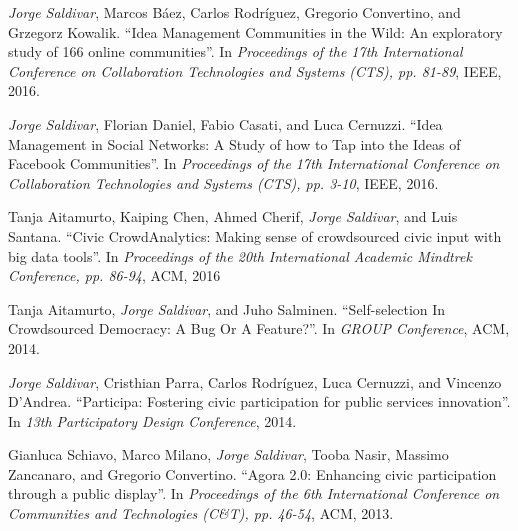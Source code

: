 \textit{Jorge Saldivar}, Marcos Báez, Carlos Rodríguez, Gregorio Convertino, and Grzegorz Kowalik. ``Idea Management Communities in the Wild: An exploratory study of 166 online communities''. In \textit{Proceedings of the 17th International Conference on Collaboration Technologies and Systems (CTS), pp. 81-89}, IEEE, 2016.

\textit{Jorge Saldivar}, Florian Daniel, Fabio Casati, and Luca Cernuzzi. ``Idea Management in Social Networks: A Study of how to Tap into the Ideas of Facebook Communities''. In \textit{Proceedings of the 17th International Conference on Collaboration Technologies and Systems (CTS), pp. 3-10}, IEEE, 2016.

Tanja Aitamurto, Kaiping Chen, Ahmed Cherif, \textit{Jorge Saldivar}, and Luis Santana. ``Civic CrowdAnalytics: Making sense of crowdsourced civic input with big data tools''. In \textit{Proceedings of the 20th International Academic Mindtrek Conference, pp. 86-94}, ACM, 2016

Tanja Aitamurto, \textit{Jorge Saldivar}, and Juho Salminen. ``Self-selection In Crowdsourced Democracy: A Bug Or A Feature?''. In \textit{GROUP Conference}, ACM, 2014.

\textit{Jorge Saldivar}, Cristhian Parra, Carlos Rodríguez, Luca Cernuzzi, and Vincenzo D’Andrea. ``Participa: Fostering civic participation for public services innovation''. In \textit{13th Participatory Design Conference}, 2014.

Gianluca Schiavo, Marco Milano, \textit{Jorge Saldivar}, Tooba Nasir, Massimo Zancanaro, and Gregorio Convertino. ``Agora 2.0: Enhancing civic participation through a public display''. In \textit{Proceedings of the 6th International Conference on Communities and Technologies (C\&T), pp. 46-54}, ACM, 2013.

